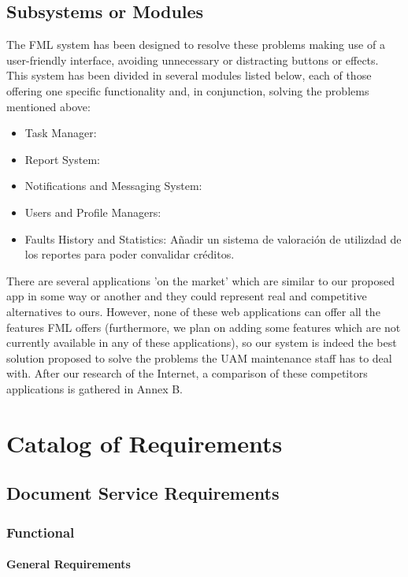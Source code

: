 \documentclass{report}
\begin{document}
\section{Subsystems or Modules}

The FML system has been designed to resolve these problems making use of a user-friendly interface, avoiding unnecessary or distracting buttons or effects. This system has been divided in several modules listed below, each of those offering one specific functionality and, in conjunction, solving the problems mentioned above:
\begin{itemize}
\item Task Manager:
\item Report System: 
\item Notifications and Messaging System:
\item Users and Profile Managers:
\item Faults History and Statistics: Añadir un sistema de valoración de utilizdad de los reportes para poder convalidar créditos.
\end{itemize}

There are several applications 'on the market' which are similar to our proposed app in some way or another and they could represent real and competitive alternatives to ours. However, none of these web applications can offer all the features FML offers (furthermore, we plan on adding some features which are not currently available in any of these applications), so our system is indeed the best solution proposed to solve the problems the UAM maintenance staff has to deal with. After our research of the Internet, a comparison of these competitors applications is gathered in Annex B.

\chapter{Catalog of Requirements}

\section{Document Service Requirements}

\subsection{Functional}

\subsubsection{General Requirements}
\end{document}
